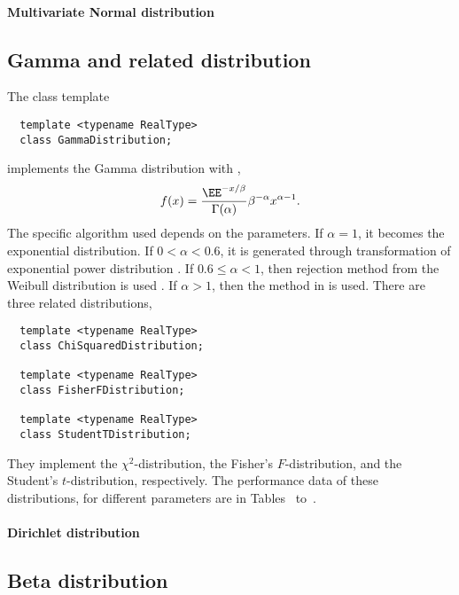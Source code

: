 \paragraph{Multivariate Normal distribution}

\subsection{Gamma and related distribution}
\label{sub:Gamma and related distribution}

The class template
\begin{Verbatim}
  template <typename RealType>
  class GammaDistribution;
\end{Verbatim}
implements the Gamma distribution with \pdf,
\begin{equation*}
  f(x) = \frac{\EE^{-x/\beta}}{\Gamma(\alpha)}\beta^{-\alpha}x^{\alpha-1}.
\end{equation*}
The specific algorithm used depends on the parameters. If $\alpha = 1$, it
becomes the exponential distribution. If $0 < \alpha < 0.6$, it is generated
through transformation of exponential power distribution
\parencite[sec~2.6]{Devroye:1986gi}. If $0.6\le\alpha<1$, then rejection method
from the Weibull distribution is used \parencite[sec.~3.4]{Devroye:1986gi}. If
$\alpha > 1$, then the method in \textcite{Marsaglia:2000vq} is used. There are
three related distributions,
\begin{Verbatim}
  template <typename RealType>
  class ChiSquaredDistribution;

  template <typename RealType>
  class FisherFDistribution;

  template <typename RealType>
  class StudentTDistribution;
\end{Verbatim}
They implement the $\chi^2$-distribution, the Fisher's $F$-distribution, and
the Student's $t$-distribution, respectively. The performance data of these
distributions, for different parameters are in Tables~ to~.

\paragraph{Dirichlet distribution}

\subsection{Beta distribution}
\label{sub:Beta distribution}

